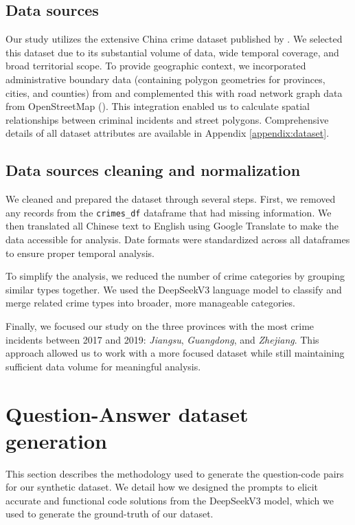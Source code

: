 \subsection{Data sources}

Our study utilizes the extensive China crime dataset published by \cite{Zhang2025CrimeDatasetChina}. We selected this dataset due to its substantial volume of data, wide temporal coverage, and broad territorial scope. To provide geographic context, we incorporated administrative boundary data (containing polygon geometries for provinces, cities, and counties) from \cite{GeoJSON2025China} and complemented this with road network graph data from OpenStreetMap (\cite{Vargas2021OSM}). This integration enabled us to calculate spatial relationships between criminal incidents and street polygons. Comprehensive details of all dataset attributes are available in Appendix \ref{appendix:dataset}.

\subsection{Data sources cleaning and normalization}
We cleaned and prepared the dataset through several steps. First, we removed any records from the \texttt{crimes\_df} dataframe that had missing information. We then translated all Chinese text to English using Google Translate to make the data accessible for analysis. Date formats were standardized across all dataframes to ensure proper temporal analysis.

To simplify the analysis, we reduced the number of crime categories by grouping similar types together. We used the DeepSeekV3 language model to classify and merge related crime types into broader, more manageable categories. 

Finally, we focused our study on the three provinces with the most crime incidents between 2017 and 2019: \textit{Jiangsu}, \textit{Guangdong}, and \textit{Zhejiang}. This approach allowed us to work with a more focused dataset while still maintaining sufficient data volume for meaningful analysis.

\section{Question-Answer dataset generation}

This section describes the methodology used to generate the question-code pairs for our synthetic dataset. We detail how we designed the prompts to elicit accurate and functional code solutions from the DeepSeekV3 model, which we used to generate the ground-truth of our dataset.

